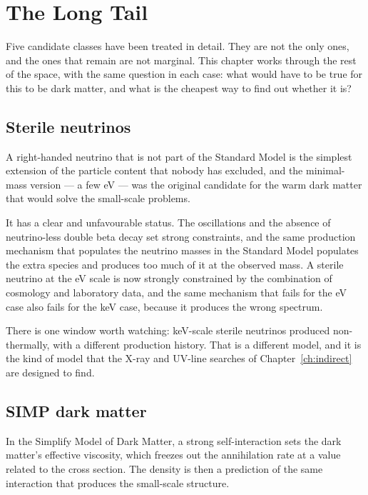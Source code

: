 
\chapter{The Long Tail}
\label{ch:longtail}

Five candidate classes have been treated in detail. They are not the only
ones, and the ones that remain are not marginal. This chapter works through
the rest of the space, with the same question in each case: what would have
to be true for this to be dark matter, and what is the cheapest way to find
out whether it is?

\section{Sterile neutrinos}A right-handed neutrino that is not part of the Standard
Model is the simplest extension of the particle content that nobody has
excluded, and the minimal-mass version --- a few eV --- was the original
candidate for the warm dark matter that would solve the small-scale problems.

It has a clear and unfavourable status. The oscillations and the absence of
neutrino-less double beta decay set strong constraints, and the same
production mechanism that populates the neutrino masses in the Standard Model
populates the extra species and produces too much of it at the observed
mass. A sterile neutrino at the eV scale is now strongly constrained by the
combination of cosmology and laboratory data, and the same mechanism that
fails for the eV case also fails for the keV case, because it produces the
wrong spectrum.

There is one window worth watching: keV-scale sterile neutrinos produced
non-thermally, with a different production history. That is a different
model, and it is the kind of model that the X-ray and UV-line searches of
Chapter~\ref{ch:indirect} are designed to find.

\section{SIMP dark matter}In the Simplify Model of Dark Matter, a strong
self-interaction sets the dark matter's effective viscosity, which freezes
out the annihilation rate at a value related to the cross section. The
density is then a prediction of the same interaction that produces the
small-scale structure.


